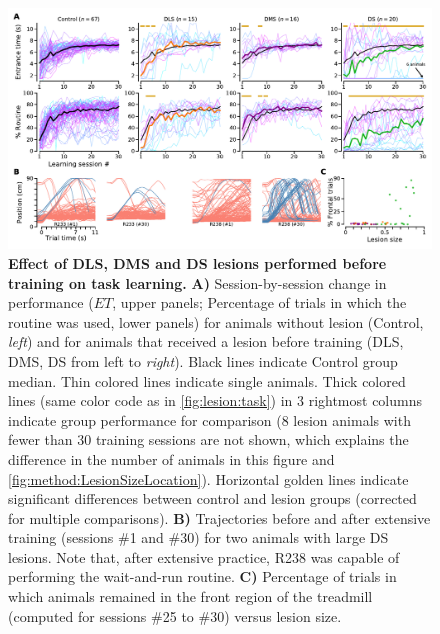 \begin{figure}[bth!]
	\begin{center}
		\includegraphics[width=\textwidth]{ch-lesion/figures/EarlyLesionLearning.pdf}
		\caption
		{\textbf{Effect of DLS, DMS and DS lesions performed before training on task learning.}
		\textbf{A)} Session-by-session change in performance ($ET$, upper panels; Percentage of trials in which the routine was used, lower panels) for animals without lesion (Control, \textit{left}) and for animals that received a lesion before training (DLS, DMS, DS from left to \textit{right}).
		Black lines indicate Control group median.
		Thin colored lines indicate single animals.
		Thick colored lines (same color code as in \autoref{fig:lesion:task}) in 3 rightmost columns indicate group performance for comparison (8 lesion animals with fewer than 30 training sessions are not shown, which explains the difference in the number of animals in this figure and \autoref{fig:method:LesionSizeLocation}).
		Horizontal golden lines indicate significant differences between control and lesion groups (corrected for multiple comparisons).
		\textbf{B)} Trajectories before and after extensive training (sessions \#1 and \#30) for two animals with large DS lesions.
		Note that, after extensive practice, R238 was capable of performing the wait-and-run routine.
		\textbf{C)} Percentage of trials in which animals remained in the front region of the treadmill (computed for sessions \#25 to \#30) versus lesion size.
		}
		\label{fig:lesion:EarlyLesionLearning}
	\end{center}
\end{figure}